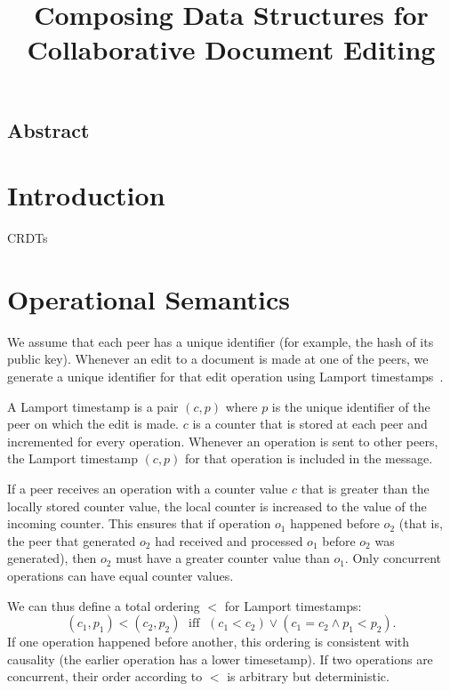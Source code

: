 \documentclass[a4paper,twocolumn,10pt]{article}
\begin{document}
\sloppy
\title{Composing Data Structures for Collaborative Document Editing}
\author{}
\maketitle

\subsection*{Abstract}

\section{Introduction}

CRDTs~\cite{Shapiro:2011wy,Roh:2011dw}

%

\section{Operational Semantics}

We assume that each peer has a unique identifier (for example, the hash of its public key). Whenever an edit to a document is made at one of the peers, we generate a unique identifier for that edit operation using Lamport timestamps~\cite{Lamport:1978jq}.

A Lamport timestamp is a pair $(c, p)$ where $p$ is the unique identifier of the peer on which the edit is made. $c$ is a counter that is stored at each peer and incremented for every operation. Whenever an operation is sent to other peers, the Lamport timestamp $(c, p)$ for that operation is included in the message.

If a peer receives an operation with a counter value $c$ that is greater than the locally stored counter value, the local counter is increased to the value of the incoming counter. This ensures that if operation $o_1$ happened before $o_2$ (that is, the peer that generated $o_2$ had received and processed $o_1$ before $o_2$ was generated), then $o_2$ must have a greater counter value than $o_1$. Only concurrent operations can have equal counter values.

We can thus define a total ordering $<$ for Lamport timestamps:
$$(c_1, p_1) < (c_2, p_2) \;\text{ iff }\; (c_1 < c_2) \vee (c_1 = c_2 \wedge p_1 < p_2).$$
If one operation happened before another, this ordering is consistent with causality (the earlier operation has a lower timesetamp). If two operations are concurrent, their order according to $<$ is arbitrary but deterministic.
\end{document}

